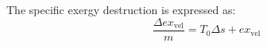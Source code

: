 The specific exergy destruction is expressed as:  
\[
\frac{\Delta ex_{\text{vel}}}{m} = T_0 \Delta s + ex_{\text{vel}}
\]